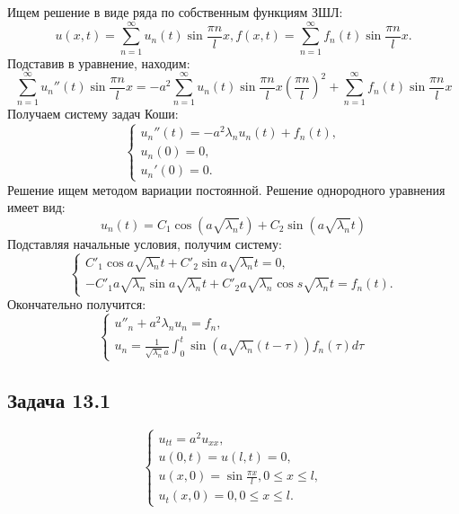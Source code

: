 \documentclass[11pt]{article}
\begin{document}
Ищем решение в виде ряда по собственным функциям ЗШЛ:
\begin{equation}
u(x, t) = \sum_{n = 1}^{\infty}u_n(t)\sin\frac{\pi n}lx,
f(x, t) = \sum_{n = 1}^{\infty}f_n(t)\sin\frac{\pi n}lx.
\end{equation}
Подставив в уравнение, находим:
\begin{equation}
\sum_{n = 1}^{\infty}u_n''(t)\sin\frac{\pi n}lx = -a^2\sum_{n = 1}^{\infty}u_n(t)\sin\frac{\pi n}lx\left(\frac{\pi n}l\right)^2 +
\sum_{n = 1}^{\infty}f_n(t)\sin\frac{\pi n}lx
\end{equation}
Получаем систему задач Коши:
\begin{equation}
\begin{cases}
u_n''(t) = -a^2\lambda_nu_n(t) + f_n(t), \\
u_n(0) = 0, \\
u_n'(0) = 0.
\end{cases}
\end{equation}
Решение ищем методом вариации постоянной. Решение однородного уравнения имеет вид:
\begin{equation}
u_n(t) = C_1\cos(a\sqrt{\lambda_n}t) + C_2\sin(a\sqrt{\lambda_n}t)
\end{equation}
Подставляя начальные условия, получим систему:
\begin{equation}
\begin{cases}
C'_1\cos a\sqrt{\lambda_n}t + C'_2\sin a\sqrt{\lambda_n}t = 0, \\
-C'_1a\sqrt{\lambda_n}\sin a\sqrt{\lambda_n}t + C'_2a\sqrt{\lambda_n}\cos s\sqrt{\lambda_n}t = f_n(t).
\end{cases}
\end{equation}
Окончательно получится:
\begin{equation}
\begin{cases}
u''_n + a^2\lambda_nu_n = f_n, \\
u_n = \frac1{\sqrt{\lambda_n}a}\int_0^t\sin(a\sqrt{\lambda_n}(t - \tau))f_n(\tau)d\tau
\end{cases}
\end{equation}
\subsection{Задача 13.1}
\label{sec:org589ea23}
\begin{equation}
\begin{cases}
u_{tt} = a^2u_{xx}, \\
u(0, t) = u(l, t) = 0, \\
u(x, 0) = \sin\frac{\pi x}l, 0 \leq x \leq l, \\
u_t(x, 0) = 0, 0 \leq x \leq l.
\end{cases}
\end{equation}
\end{document}
